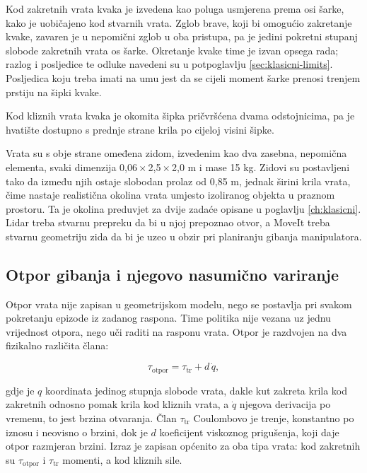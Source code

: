 Kod zakretnih vrata kvaka je izvedena kao poluga usmjerena prema osi šarke, kako je uobičajeno
kod stvarnih vrata. Zglob brave, koji bi omogućio zakretanje kvake, zavaren je u nepomični
zglob u oba pristupa, pa je jedini pokretni stupanj slobode zakretnih vrata os šarke.
Okretanje kvake time je izvan opsega rada; razlog i posljedice te odluke navedeni su u
potpoglavlju \ref{sec:klasicni-limits}. Posljedica koju treba imati na umu jest da se cijeli
moment šarke prenosi trenjem prstiju na šipki kvake.

Kod kliznih vrata kvaka je okomita šipka pričvršćena dvama odstojnicima, pa je hvatište
dostupno s prednje strane krila po cijeloj visini šipke.

Vrata su s obje strane omeđena zidom, izvedenim kao dva zasebna, nepomična elementa,
svaki dimenzija 0,06\,$\times$\,2,5\,$\times$\,2,0 m i mase 15 kg.
Zidovi su postavljeni tako da između njih ostaje slobodan prolaz od 0,85 m,
jednak širini krila vrata, čime nastaje realistična okolina vrata umjesto izoliranog objekta u
praznom prostoru. Ta je okolina preduvjet za dvije zadaće opisane u poglavlju
\ref{ch:klasicni}. Lidar treba stvarnu prepreku da bi u njoj prepoznao otvor, a MoveIt treba
stvarnu geometriju zida da bi je uzeo u obzir pri planiranju gibanja manipulatora.

\subsection{Otpor gibanja i njegovo nasumično variranje}
\label{sec:otpor}

Otpor vrata nije zapisan u geometrijskom modelu, nego se postavlja pri svakom pokretanju
epizode iz zadanog raspona. Time politika nije vezana uz jednu vrijednost otpora, nego uči
raditi na rasponu vrata. Otpor je razdvojen na dva fizikalno različita člana:

\begin{equation}
    \tau_{\mathrm{otpor}} = \tau_{\mathrm{tr}} + d\,\dot{q} ,
    \label{eq:otpor}
\end{equation}

gdje je $q$ koordinata jedinog stupnja slobode vrata, dakle kut zakreta krila kod zakretnih
odnosno pomak krila kod kliznih vrata, a $\dot{q}$ njegova derivacija po vremenu, to jest
brzina otvaranja. Član $\tau_{\mathrm{tr}}$ Coulombovo je trenje, konstantno po iznosu i
neovisno o brzini, dok je $d$ koeficijent viskoznog prigušenja, koji daje otpor razmjeran
brzini. Izraz je zapisan općenito za oba tipa vrata: kod zakretnih su $\tau_{\mathrm{otpor}}$
i $\tau_{\mathrm{tr}}$ momenti, a kod kliznih sile.

